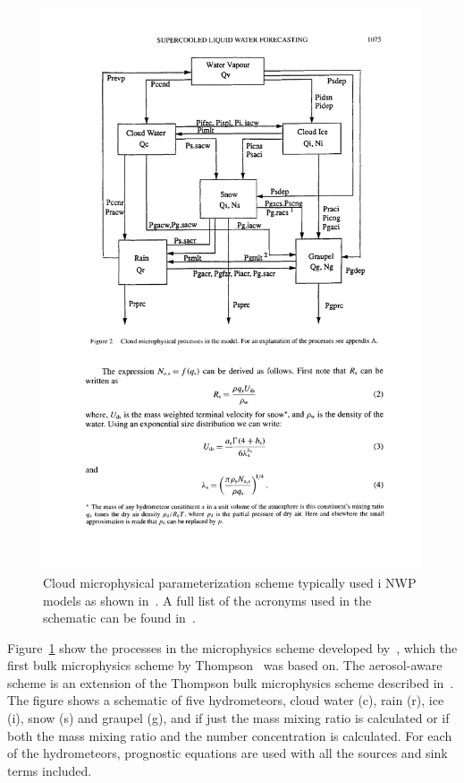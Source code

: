 \begin{figure}
\centering
\includegraphics[scale=0.8]{model_methods/microphysics.pdf}
\caption{Cloud microphysical parameterization scheme typically used i NWP models as shown in~\citet{Reisner1998}. A full list of the acronyms used in the schematic can be found in~\citet{Reisner1998}.}
\label{fig:microphysics}
\end{figure}

Figure~\ref{fig:microphysics} show the processes in the microphysics scheme developed by~\citet{Reisner1998}, which the first bulk microphysics scheme by Thompson~\citep{Thompson2004} was based on. The aerosol-aware scheme is an extension of the Thompson bulk microphysics scheme described in~\citet{Thompson2008}. The figure shows a schematic of five hydrometeors, cloud water (c), rain (r), ice (i), snow (s) and graupel (g), and if just the mass mixing ratio is calculated or if both the mass mixing ratio and the number concentration is calculated. For each of the hydrometeors, prognostic equations are used with all the sources and sink terms included.%
%

